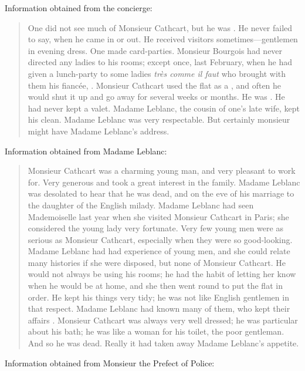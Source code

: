 Information obtained from the concierge:
\begin{quote}
One did not see much of Monsieur Cathcart, but he was .  He never failed to say,  when he came in or out. He received visitors sometimes—gentlemen in evening dress. One made card-parties. Monsieur Bourgois had never directed any ladies to his rooms; except once, last February, when he had given a lunch-party to some ladies \textit{très comme il faut} who brought with them his fiancée, . Monsieur Cathcart used the flat as a , and often he would shut it up and go away for several weeks or months. He was . He had never kept a valet. Madame Leblanc, the cousin of one's late wife, kept his  clean. Madame Leblanc was very respectable. But certainly monsieur might have Madame Leblanc's address.
\end{quote}

Information obtained from Madame Leblanc:

\begin{quote}
Monsieur Cathcart was a charming young man, and very pleasant to work for. Very generous and took a great interest in the family. Madame Leblanc was desolated to hear that he was dead, and on the eve of his marriage to the daughter of the English milady. Madame Leblanc had seen Mademoiselle last year when she visited Monsieur Cathcart in Paris; she considered the young lady very fortunate. Very few young men were as serious as Monsieur Cathcart, especially when they were so good-looking. Madame Leblanc had had experience of young men, and she could relate many histories if she were disposed, but none of Monsieur Cathcart. He would not always be using his rooms; he had the habit of letting her know when he would be at home, and she then went round to put the flat in order. He kept his things very tidy; he was not like English gentlemen in that respect. Madame Leblanc had known many of them, who kept their affairs . Monsieur Cathcart was always very well dressed; he was particular about his bath; he was like a woman for his toilet, the poor gentleman. And so he was dead.  Really it had taken away Madame Leblanc's appetite.
\end{quote}

Information obtained from Monsieur the Prefect of Police:

